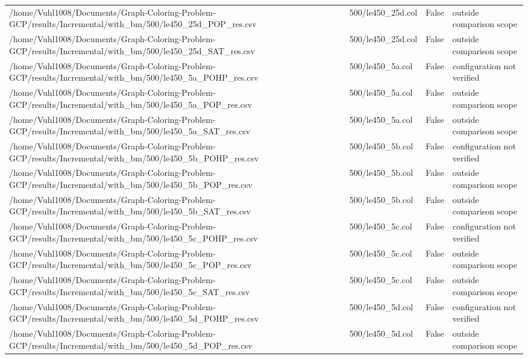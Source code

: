 \begin{table}[htbp]
\begin{tabular}{llll}
/home/Vuhl1008/Documents/Graph-Coloring-Problem-GCP/results/Incremental/with\_bm/500/le450\_25d\_POP\_res.csv & 500/le450\_25d.col & False & outside comparison scope \\
/home/Vuhl1008/Documents/Graph-Coloring-Problem-GCP/results/Incremental/with\_bm/500/le450\_25d\_SAT\_res.csv & 500/le450\_25d.col & False & outside comparison scope \\
/home/Vuhl1008/Documents/Graph-Coloring-Problem-GCP/results/Incremental/with\_bm/500/le450\_5a\_POHP\_res.csv & 500/le450\_5a.col & False & configuration not verified \\
/home/Vuhl1008/Documents/Graph-Coloring-Problem-GCP/results/Incremental/with\_bm/500/le450\_5a\_POP\_res.csv & 500/le450\_5a.col & False & outside comparison scope \\
/home/Vuhl1008/Documents/Graph-Coloring-Problem-GCP/results/Incremental/with\_bm/500/le450\_5a\_SAT\_res.csv & 500/le450\_5a.col & False & outside comparison scope \\
/home/Vuhl1008/Documents/Graph-Coloring-Problem-GCP/results/Incremental/with\_bm/500/le450\_5b\_POHP\_res.csv & 500/le450\_5b.col & False & configuration not verified \\
/home/Vuhl1008/Documents/Graph-Coloring-Problem-GCP/results/Incremental/with\_bm/500/le450\_5b\_POP\_res.csv & 500/le450\_5b.col & False & outside comparison scope \\
/home/Vuhl1008/Documents/Graph-Coloring-Problem-GCP/results/Incremental/with\_bm/500/le450\_5b\_SAT\_res.csv & 500/le450\_5b.col & False & outside comparison scope \\
/home/Vuhl1008/Documents/Graph-Coloring-Problem-GCP/results/Incremental/with\_bm/500/le450\_5c\_POHP\_res.csv & 500/le450\_5c.col & False & configuration not verified \\
/home/Vuhl1008/Documents/Graph-Coloring-Problem-GCP/results/Incremental/with\_bm/500/le450\_5c\_POP\_res.csv & 500/le450\_5c.col & False & outside comparison scope \\
/home/Vuhl1008/Documents/Graph-Coloring-Problem-GCP/results/Incremental/with\_bm/500/le450\_5c\_SAT\_res.csv & 500/le450\_5c.col & False & outside comparison scope \\
/home/Vuhl1008/Documents/Graph-Coloring-Problem-GCP/results/Incremental/with\_bm/500/le450\_5d\_POHP\_res.csv & 500/le450\_5d.col & False & configuration not verified \\
/home/Vuhl1008/Documents/Graph-Coloring-Problem-GCP/results/Incremental/with\_bm/500/le450\_5d\_POP\_res.csv & 500/le450\_5d.col & False & outside comparison scope \\

\end{tabular}
\end{table}

